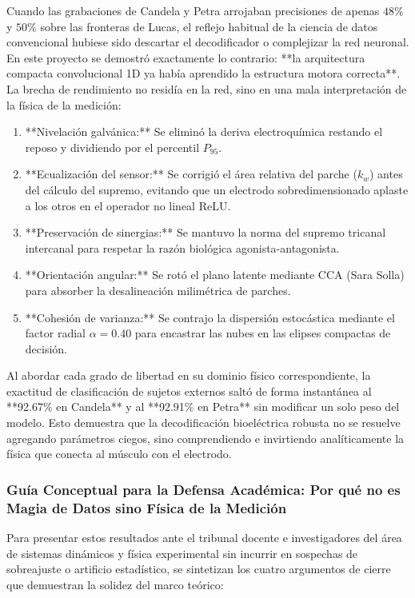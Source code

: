 \documentclass[11pt,a4paper,openany]{book}
\theoremstyle{definition}
\begin{document}
Cuando las grabaciones de Candela y Petra arrojaban precisiones de apenas $48\%$ y $50\%$ sobre las fronteras de Lucas, el reflejo habitual de la ciencia de datos convencional hubiese sido descartar el decodificador o complejizar la red neuronal. En este proyecto se demostró exactamente lo contrario: **la arquitectura compacta convolucional 1D ya había aprendido la estructura motora correcta**. La brecha de rendimiento no residía en la red, sino en una mala interpretación de la física de la medición:
\begin{enumerate}
    \item **Nivelación galvánica:** Se eliminó la deriva electroquímica restando el reposo y dividiendo por el percentil $P_{95}$.
    \item **Ecualización del sensor:** Se corrigió el área relativa del parche ($k_w$) antes del cálculo del supremo, evitando que un electrodo sobredimensionado aplaste a los otros en el operador no lineal $\text{ReLU}$.
    \item **Preservación de sinergias:** Se mantuvo la norma del supremo tricanal intercanal para respetar la razón biológica agonista-antagonista.
    \item **Orientación angular:** Se rotó el plano latente mediante CCA (Sara Solla) para absorber la desalineación milimétrica de parches.
    \item **Cohesión de varianza:** Se contrajo la dispersión estocástica mediante el factor radial $\alpha = 0.40$ para encastrar las nubes en las elipses compactas de decisión.
\end{enumerate}

Al abordar cada grado de libertad en su dominio físico correspondiente, la exactitud de clasificación de sujetos externos saltó de forma instantánea al **92.67\% en Candela** y al **92.91\% en Petra** sin modificar un solo peso del modelo. Esto demuestra que la decodificación bioeléctrica robusta no se resuelve agregando parámetros ciegos, sino comprendiendo e invirtiendo analíticamente la física que conecta al músculo con el electrodo.

\subsubsection{Guía Conceptual para la Defensa Académica: Por qué no es Magia de Datos sino Física de la Medición}
\label{subsubsec:guia_defensa_academica}

Para presentar estos resultados ante el tribunal docente e investigadores del área de sistemas dinámicos y física experimental sin incurrir en sospechas de sobreajuste o artificio estadístico, se sintetizan los cuatro argumentos de cierre que demuestran la solidez del marco teórico:
\end{document}
